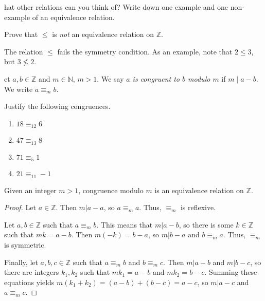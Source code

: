 \documentclass[english,course]{lecture}
\renewcommand{\le}{\leqslant}
\newenvironment{solution}[1][Solution]{\begin{trivlist}\pushQED{\qed}\item[\hskip \labelsep  \bfseries #1{}.\hspace{10pt}]}{\popQED\end{trivlist}}\renewcommand{\qedsymbol}{$\checkmark$}{\newenvironment{answer}{\renewcommand\qedsymbol{$\blacklozenge$}\begin{proof}[Answer]}{\end{proof}}}\newenvironment{answer}[1][Answer]{\begin{trivlist}\pushQED{\qed}\item[\hskip \labelsep  \bfseries #1{}.\hspace{10pt}]}{\popQED\end{trivlist}}\renewcommand{\qedsymbol}{$\lozenge$}
\theoremstyle{plain}
\newenvironment{question}[1]
  {\renewcommand\theinnerquestion{#1}\innerquestion}
  {\endinnerquestion}
\newenvironment{definition}[1]
  {\renewcommand\theinnerdefinition{#1}\innerdefinition}
  {\endinnerdefinition}
\def\Z{{\mathbb Z}}
\def\N{{\mathbb N}}
\def\presnotes{}
\begin{document}
\presnotes

\begin{question}
	What other relations can you think of? Write down one example and one non-example of an equivalence relation.
\end{question}

\presnotes

\begin{exer}
	Prove that $\le$ is \emph{not} an equivalence relation on $\Z$.
\end{exer}

\begin{solution}
	The relation $\le$ fails the symmetry condition.
	As an example, note that $2 \le 3$, but $3\not\le 2$.
\end{solution}

\presnotes

\begin{definition}
	Let $a,b\in \Z$ and $m \in \N$, $m > 1$.
	We say \emph{$a$ is congruent to $b$ modulo $m$} if $m\mid a-b$.
	We write $a \equiv_m b$.
\end{definition}

\begin{exer}
	Justify the following congruences.
	\begin{enumerate}
		
		\item[(a)] $18 \equiv_{12} 6$
		\item[(b)] $47 \equiv_{13} 8$
		\item[(c)] $71 \equiv_5 1$
		\item[(d)] $21 \equiv_{11} -1$
		
	\end{enumerate}
\end{exer}

\presnotes

\begin{theorem}
	Given an integer $m > 1$, congruence modulo $m$ is an equivalence relation on $\Z$.
\end{theorem}

\begin{proof}
	Let $a\in \Z$. Then $m|a-a$, so $a \equiv_m a$. Thus, $\equiv_m$ is reflexive.
	
	Let $a,b\in \Z$ such that $a\equiv_m b$. This means that $m|a-b$, so there is some $k\in \Z$ such that $mk = a-b$. Then $m(-k) = b-a$, so $m|b-a$ and $b \equiv_m a$. Thus, $\equiv_m$ is symmetric.
	
	Finally, let $a,b,c\in \Z$ such that $a\equiv_m b$ and $b\equiv_m c$.
	Then $m|a-b$ and $m|b-c$, so there are integers $k_1, k_2$ such that $m k_1 = a-b$ and $m k_2 = b-c$.
	Summing these equations yields $m(k_1 + k_2) = (a-b) + (b-c) = a-c$, so $m|a-c$ and $a\equiv_m c$.
\end{proof}
\end{document}
